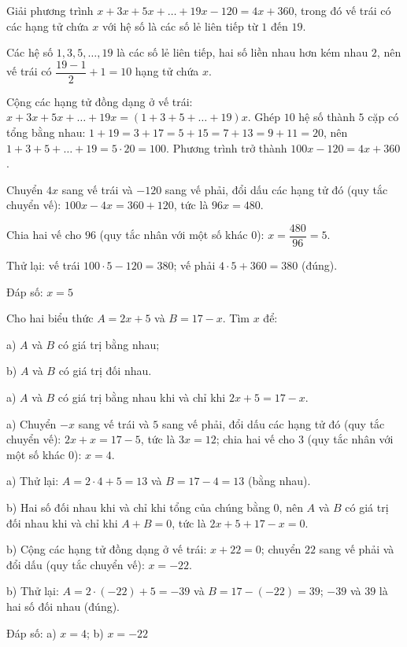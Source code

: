 \begin{problem}[8DS-PT1-025]
Giải phương trình $x + 3x + 5x + \dots + 19x - 120 = 4x + 360$, trong đó vế trái có các hạng tử chứa $x$ với hệ số là các số lẻ liên tiếp từ $1$ đến $19$.

\begin{solution}
Các hệ số $1, 3, 5, \dots, 19$ là các số lẻ liên tiếp, hai số liền nhau hơn kém nhau $2$, nên vế trái có $\dfrac{19 - 1}{2} + 1 = 10$ hạng tử chứa $x$.

Cộng các hạng tử đồng dạng ở vế trái: $x + 3x + 5x + \dots + 19x = (1 + 3 + 5 + \dots + 19)x$. Ghép $10$ hệ số thành $5$ cặp có tổng bằng nhau: $1 + 19 = 3 + 17 = 5 + 15 = 7 + 13 = 9 + 11 = 20$, nên $1 + 3 + 5 + \dots + 19 = 5 \cdot 20 = 100$. Phương trình trở thành $100x - 120 = 4x + 360$.

Chuyển $4x$ sang vế trái và $-120$ sang vế phải, đổi dấu các hạng tử đó (quy tắc chuyển vế): $100x - 4x = 360 + 120$, tức là $96x = 480$.

Chia hai vế cho $96$ (quy tắc nhân với một số khác $0$): $x = \dfrac{480}{96} = 5$.

Thử lại: vế trái $100 \cdot 5 - 120 = 380$; vế phải $4 \cdot 5 + 360 = 380$ (đúng).

Đáp số: $\boxed{x = 5}$
\end{solution}
\end{problem}

\begin{problem}[8DS-PT1-026]
Cho hai biểu thức $A = 2x + 5$ và $B = 17 - x$. Tìm $x$ để:

a) $A$ và $B$ có giá trị bằng nhau;

b) $A$ và $B$ có giá trị đối nhau.

\begin{solution}
a) $A$ và $B$ có giá trị bằng nhau khi và chỉ khi $2x + 5 = 17 - x$.

a) Chuyển $-x$ sang vế trái và $5$ sang vế phải, đổi dấu các hạng tử đó (quy tắc chuyển vế): $2x + x = 17 - 5$, tức là $3x = 12$; chia hai vế cho $3$ (quy tắc nhân với một số khác $0$): $x = 4$.

a) Thử lại: $A = 2 \cdot 4 + 5 = 13$ và $B = 17 - 4 = 13$ (bằng nhau).

b) Hai số đối nhau khi và chỉ khi tổng của chúng bằng $0$, nên $A$ và $B$ có giá trị đối nhau khi và chỉ khi $A + B = 0$, tức là $2x + 5 + 17 - x = 0$.

b) Cộng các hạng tử đồng dạng ở vế trái: $x + 22 = 0$; chuyển $22$ sang vế phải và đổi dấu (quy tắc chuyển vế): $x = -22$.

b) Thử lại: $A = 2 \cdot (-22) + 5 = -39$ và $B = 17 - (-22) = 39$; $-39$ và $39$ là hai số đối nhau (đúng).

Đáp số: a) $\boxed{x = 4}$; b) $\boxed{x = -22}$
\end{solution}
\end{problem}

